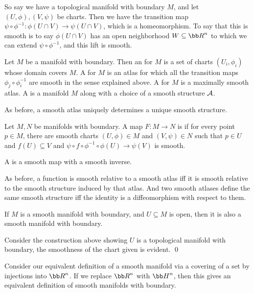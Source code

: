 So say we have a topological manifold with boundary $M$, and let $(U,\phi),(V,\psi)$ be charts.
Then we have the transition map $\psi\circ\phi^{-1}\colon\phi(U\cap V)\to\psi(U\cap V)$, which is a homeomorphism.
To say that this is smooth is to say $\phi(U\cap V)$ has an open neighborhood $W\subseteq\bR^n$ to which we can extend $\psi\circ\phi^{-1}$,
and this lift is smooth.

\bdefn

    Let $M$ be a manifold with boundary.
    Then an  for $M$ is a set of charts $(U_i,\phi_i)$ whose domain covers $M$.
    A  for $M$ is an atlas for which all the transition maps $\phi_j\circ\phi_i^{-1}$ are smooth in the sense explained
    above.
    A  for $M$ is a maximally smooth atlas.
    A  is a manifold $M$ along with a choice of a smooth structure ${{\cal A}}$.

\edefn

As before, a smooth atlas uniquely determines a unique smooth structure.

\bdefn

    Let $M,N$ be manifolds with boundary.
    A map $F\colon M\to N$ is  if for every point $p\in M$, there are smooth charts $(U,\phi)\in M$ and $(V,\psi)\in N$
    such that $p\in U$ and $f(U)\subseteq V$ and $\psi\circ f\circ\phi^{-1}\circ\phi(U)\to\psi(V)$ is smooth.

    A  is a smooth map with a smooth inverse.

\edefn

As before, a function is smooth relative to a smooth atlas iff it is smooth relative to the smooth structure induced by that atlas.
And two smooth atlases define the same smooth structure iff the identity is a diffeomorphism with respect to them.

\bprop

    If $M$ is a smooth manifold with boundary, and $U\subseteq M$ is open, then it is also a smooth manifold with boundary.

\eprop

\bproof

    Consider the construction above showing $U$ is a topological manifold with boundary, the smoothness of the chart given is evident.
    \qed

\eproof

\bnote

    Consider our equivalent definition of a smooth manifold via a covering of a set by injections into $\bR^n$.
    If we replace $\bR^n$ with $\bH^n$, then this gives an equivalent definition of smooth manifolds with boundary.

